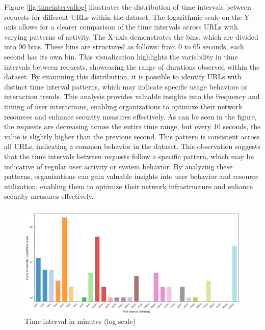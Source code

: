 Figure \ref{fig:timeintervallog} illustrates the distribution of time intervals between requests for different URLs within the dataset. The logarithmic scale on the Y-axis allows for a clearer comparison of the time intervals across URLs with varying patterns of activity. The X-axis demonstrates the bins, which are divided into 90 bins. These bins are structured as follows: from 0 to 65 seconds, each second has its own bin. This visualization highlights the variability in time intervals between requests, showcasing the range of durations observed within the dataset. By examining this distribution, it is possible to identify URLs with distinct time interval patterns, which may indicate specific usage behaviors or interaction trends. This analysis provides valuable insights into the frequency and timing of user interactions, enabling organizations to optimize their network resources and enhance security measures effectively. As can be seen in the figure, the requests are decreasing across the entire time range, but every 10 seconds, the value is slightly higher than the previous second. This pattern is consistent across all URLs, indicating a common behavior in the dataset. This observation suggests that the time intervals between requests follow a specific pattern, which may be indicative of regular user activity or system behavior. By analyzing these patterns, organizations can gain valuable insights into user behavior and resource utilization, enabling them to optimize their network infrastructure and enhance security measures effectively. 

\begin{figure}
    \centering
    \includegraphics[width=\textwidth]{../Thesis_Docs/media/minutes.png}
    \caption{Time interval in minutes (log scale) }
    \label{fig:timeintervallogmin}
\end{figure}

